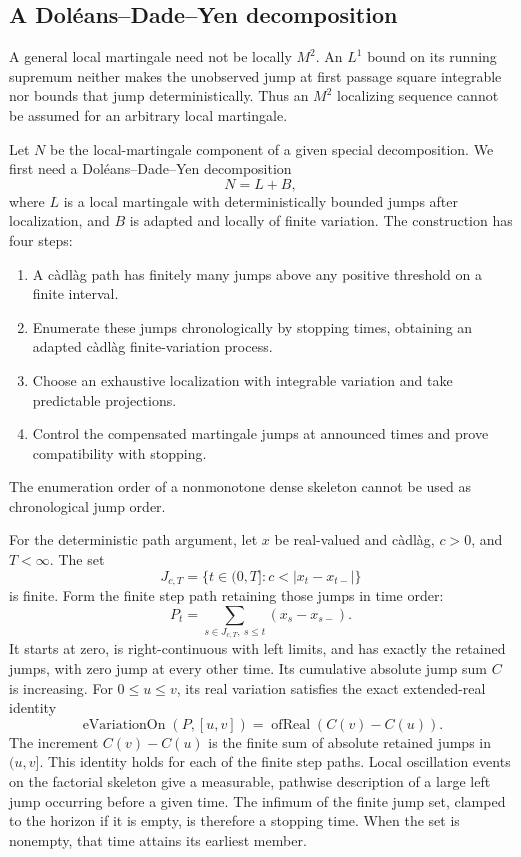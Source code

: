 \subsection{A Doléans--Dade--Yen decomposition}
A general local martingale need not be locally $M^2$. An $L^1$ bound on its
running supremum neither makes the unobserved jump at first passage square
integrable nor bounds that jump deterministically. Thus an $M^2$ localizing
sequence cannot be assumed for an arbitrary local martingale.

Let $N$ be the local-martingale component of a given special decomposition.
We first need a Doléans--Dade--Yen decomposition
\[
 N=L+B,
\]
where $L$ is a local martingale with deterministically bounded jumps after
localization, and $B$ is adapted and locally of finite variation.
The construction has four steps:
\begin{enumerate}
\item A c\`adl\`ag path has finitely many jumps above any positive threshold
on a finite interval.
\item Enumerate these jumps chronologically by stopping times, obtaining an
adapted c\`adl\`ag finite-variation process.
\item Choose an exhaustive localization with integrable variation and take
predictable projections.
\item Control the compensated martingale jumps at announced times and prove
compatibility with stopping.
\end{enumerate}
The enumeration order of a nonmonotone dense skeleton cannot be used as
chronological jump order.

For the deterministic path argument, let $x$ be real-valued and c\`adl\`ag,
$c>0$, and $T<\infty$. The set
\[
 J_{c,T}=\{t\in(0,T]:c<|x_t-x_{t-}|\}
\]
is finite. Form the finite step path retaining those jumps in time order:
\[
 P_t=\sum_{s\in J_{c,T},\ s\leq t}(x_s-x_{s-}).
\]
It starts at zero, is right-continuous with left limits, and has exactly
the retained jumps, with zero jump at every other time. Its cumulative
absolute jump sum $C$ is increasing. For $0\leq u\leq v$, its real
variation satisfies the exact extended-real identity
\[
 \operatorname{eVariationOn}(P,[u,v])
 =\operatorname{ofReal}(C(v)-C(u)).
\]
The increment $C(v)-C(u)$ is the finite sum of absolute retained jumps in
$(u,v]$. This identity holds for each of the finite step paths.
Local oscillation events on the factorial skeleton give a measurable,
pathwise description of a large left jump occurring before a given time.
The infimum of the finite jump set, clamped to the horizon if it is empty,
is therefore a stopping time. When the set is nonempty, that time attains
its earliest member.


